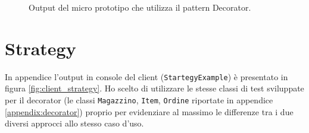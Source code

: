 \documentclass[12pt]{article}
\begin{document}
\begin{figure}[h!]
  \caption{\small Output del micro prototipo che utilizza il pattern Decorator.}
  \label{fig:client_decorator}
\end{figure}


\newpage
\section{Strategy}
\label{appendix:strategy}

In appendice l'output in console del client ({\tt StartegyExample}) è presentato in figura \ref{fig:client_strategy}. Ho scelto di utilizzare le stesse classi di test sviluppate per il decorator (le classi {\tt Magazzino}, {\tt Item}, {\tt Ordine} riportate in appendice \ref{appendix:decorator}) proprio per evidenziare al massimo le differenze tra i due diversi approcci allo stesso caso d'uso.
\end{document}
